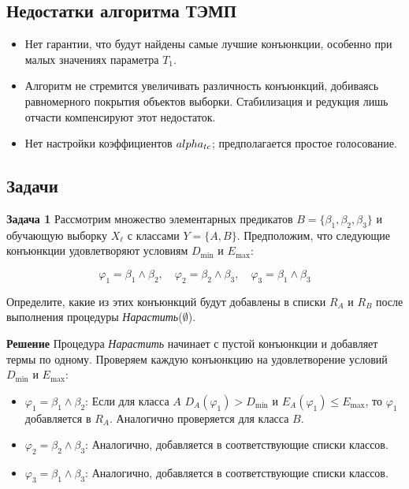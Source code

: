 \subsection{Недостатки алгоритма ТЭМП}

\begin{itemize}
    \item Нет гарантии, что будут найдены самые лучшие конъюнкции, особенно при малых значениях параметра $T_1$.
    \item Алгоритм не стремится увеличивать различность конъюнкций, добиваясь равномерного покрытия объектов выборки. Стабилизация и редукция лишь отчасти компенсируют этот недостаток.
    \item Нет настройки коэффициентов $\\alpha_{tc}$; предполагается простое голосование.

\end{itemize}

\subsection{Задачи}

\textbf{Задача 1}  
Рассмотрим множество элементарных предикатов \( B = \{ \beta_1, \beta_2, \beta_3 \} \) и обучающую выборку \( X_\ell \) с классами \( Y = \{A, B\} \). Предположим, что следующие конъюнкции удовлетворяют условиям \( D_{\text{min}} \) и \( E_{\text{max}} \):

\[
\varphi_1 = \beta_1 \wedge \beta_2, \quad \varphi_2 = \beta_2 \wedge \beta_3, \quad \varphi_3 = \beta_1 \wedge \beta_3
\]

Определите, какие из этих конъюнкций будут добавлены в списки \( R_A \) и \( R_B \) после выполнения процедуры \textit{Нарастить}(\(\emptyset\)).

\textbf{Решение}  
Процедура \textit{Нарастить} начинает с пустой конъюнкции и добавляет термы по одному. Проверяем каждую конъюнкцию на удовлетворение условий \( D_{\text{min}} \) и \( E_{\text{max}} \):

\begin{itemize}
    \item \(\varphi_1 = \beta_1 \wedge \beta_2\): Если для класса \(A\) \(D_A(\varphi_1) > D_{\text{min}}\) и \(E_A(\varphi_1) \leq E_{\text{max}}\), то \(\varphi_1\) добавляется в \( R_A \). Аналогично проверяется для класса \(B\).
    \item \(\varphi_2 = \beta_2 \wedge \beta_3\): Аналогично, добавляется в соответствующие списки классов.
    \item \(\varphi_3 = \beta_1 \wedge \beta_3\): Аналогично, добавляется в соответствующие списки классов.
\end{itemize}


